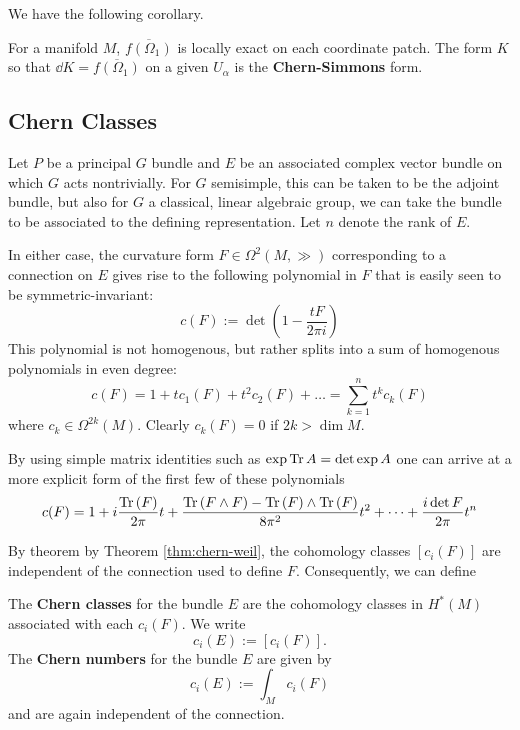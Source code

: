 		We have the following corollary. 
		\begin{cor}
			For a manifold $M$, $\overline{f(\Omega_1)}$ is locally exact on each coordinate patch. The form $K$ so that $\dd K = \overline{f(\Omega_1)}$ on a given $U_\alpha$ is the \textbf{Chern-Simmons} form.
		\end{cor}
		
		\subsection{Chern Classes}
		
		Let $P$ be a principal $G$ bundle and $E$ be an associated complex vector bundle on which $G$ acts nontrivially. For $G$ semisimple, this can be taken to be the adjoint bundle, but also for $G$ a classical, linear algebraic group, we can take the bundle to be associated to the defining representation. Let $n$ denote the rank of $E$.
		
		In either case, the curvature form $F \in \Omega^2(M, \gg)$ corresponding to a connection on $E$ gives rise to the following polynomial in $F$ that is easily seen to be symmetric-invariant:
		\begin{equation}
			c(F) := \det(1 - \frac{t F}{2\pi i})
		\end{equation}
		This polynomial is not homogenous, but rather splits into a sum of homogenous polynomials in even degree:
		\begin{equation}
			c(F) = 1 + t c_1(F) + t^2 c_2(F) + \dots = \sum_{k=1}^n t^k c_k(F)
		\end{equation}
		where $c_k \in \Omega^{2k}(M)$. Clearly $c_k(F) = 0$ if $2k > \dim M$.
		
		By using simple matrix identities such as $\exp{\mathrm{Tr}\,A} = \det \exp A$ one can arrive at a more explicit form of the first few of these polynomials
		\[
			c(F) = 1 + i \frac{\mathrm{Tr}\,(F)}{2\pi} t + \frac{\mathrm{Tr}\,(F \wedge F) - \mathrm{Tr}\,(F) \wedge \mathrm{Tr}\,(F)}{8\pi^2} t^2 + \dots + \frac{i \det F}{2\pi} t^n
		\]
		
		 By theorem by Theorem \ref{thm:chern-weil}, the cohomology classes $[c_i(F)]$ are independent of the connection used to define $F$. Consequently, we can define 
		 \begin{defn} \label{defn:chern}
		 	The \textbf{Chern classes} for the bundle $E$ are the cohomology classes in $H^*(M)$ associated with each $c_i(F)$. We write 
			\[
				c_i(E) := [c_i (F)].
			\]
			The \textbf{Chern numbers} for the bundle $E$ are given by
			\[
				c_i(E) := \int_{M} c_i(F)
			\]
			and are again independent of the connection. 
		 \end{defn}
		 
